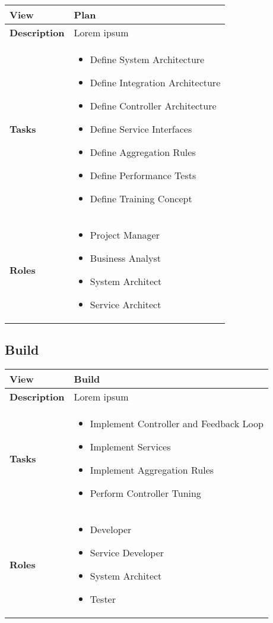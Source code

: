 	\label{table:ch6_View_Plan}
	\begin{tabular}
		{|m{2cm}|m{10cm}|} \hline \bfseries View & Plan\\
		\hline \bfseries Description & Lorem ipsum\\
		\hline \bfseries Tasks & 
		\begin{itemize}
			\item Define System Architecture
			\item Define Integration Architecture
			\item Define Controller Architecture
			\item Define Service Interfaces
			\item Define Aggregation Rules
			\item Define Performance Tests
			\item Define Training Concept
		\end{itemize}
		\\
		\hline \bfseries Roles &
		\begin{itemize}
			\item Project Manager
			\item Business Analyst
			\item System Architect
			\item Service Architect
		\end{itemize}
		\\
		\hline 
	\end{tabular}

\subsection{Build}
\label{table:ch6_View_Build}
\begin{tabular}
	{|m{2cm}|m{10cm}|} \hline \bfseries View & Build\\
	\hline \bfseries Description & Lorem ipsum\\
	\hline \bfseries Tasks & 
	\begin{itemize}
		\item Implement Controller and Feedback Loop
		\item Implement Services
		\item Implement Aggregation Rules
		\item Perform Controller Tuning
	\end{itemize}
	\\
	\hline \bfseries Roles &
	\begin{itemize}
		\item Developer
		\item Service Developer
		\item System Architect
		\item Tester
	\end{itemize}
	\\
	\hline 
\end{tabular}

